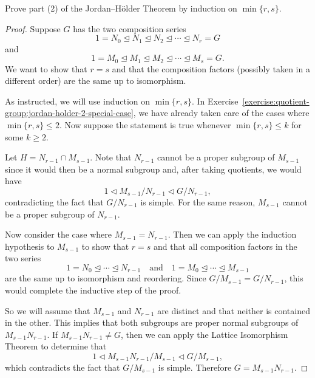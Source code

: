  Prove part (2) of the Jordan--H\"older Theorem by
induction on $\min\{r, s\}$.
\begin{proof}
  Suppose $G$ has the two composition series
  \begin{equation}
    \label{eq:quotient-group:holder:G-comp-N-i}
    1 = N_0 \trianglelefteq
    N_1 \trianglelefteq
    N_2 \trianglelefteq\cdots\trianglelefteq
    N_r = G
  \end{equation}
  and
  \begin{equation}
    \label{eq:quotient-group:holder:G-comp-M-i}
    1 = M_0 \trianglelefteq
    M_1 \trianglelefteq
    M_2 \trianglelefteq\cdots\trianglelefteq
    M_s = G.
  \end{equation}
  We want to show that $r = s$ and that the composition factors
  (possibly taken in a different order) are the same up to
  isomorphism.

  As instructed, we will use induction on $\min\{r, s\}$. In
  Exercise~\ref{exercise:quotient-group:jordan-holder-2-special-case},
  we have already taken care of the cases where $\min\{r,
  s\}\leq2$. Now suppose the statement is true whenever
  $\min\{r, s\}\leq k$ for some $k\geq 2$.

  Let $H = N_{r-1}\cap M_{s-1}$. Note that $N_{r-1}$ cannot be a
  proper subgroup of $M_{s-1}$ since it would then be a normal
  subgroup and, after taking quotients, we would have
  \begin{equation*}
    1\triangleleft M_{s-1}/N_{r-1} \triangleleft G/N_{r-1},
  \end{equation*}
  contradicting the fact that $G/N_{r-1}$ is simple. For the same
  reason, $M_{s-1}$ cannot be a proper subgroup of $N_{r-1}$.

  Now consider the case where $M_{s-1} = N_{r-1}$. Then we can apply
  the induction hypothesis to $M_{s-1}$ to show that $r = s$ and that
  all composition factors in the two series
  \begin{equation*}
    1 = N_0\trianglelefteq\cdots\trianglelefteq N_{r-1}
    \quad\text{and}\quad
    1 = M_0\trianglelefteq\cdots\trianglelefteq M_{s-1}
  \end{equation*}
  are the same up to isomorphism and reordering. Since
  $G/M_{s-1} = G/N_{r-1}$, this would complete the inductive step of
  the proof.

  So we will assume that $M_{s-1}$ and $N_{r-1}$ are distinct and that
  neither is contained in the other. This implies that both subgroups
  are proper normal subgroups of $M_{s-1}N_{r-1}$. If
  $M_{s-1}N_{r-1}\neq G$, then we can apply the Lattice Isomorphism
  Theorem to determine that
  \begin{equation*}
    1 \triangleleft M_{s-1}N_{r-1}/M_{s-1} \triangleleft G/M_{s-1},
  \end{equation*}
  which contradicts the fact that $G/M_{s-1}$ is simple. Therefore
  $G = M_{s-1}N_{r-1}$.


\end{proof}
